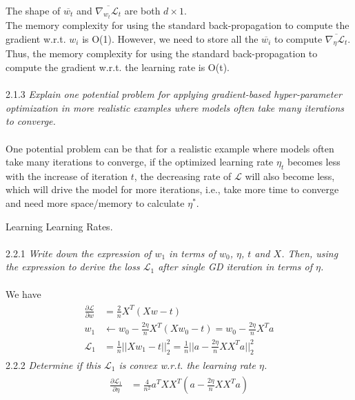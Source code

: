 \documentclass{myhw}
\begin{document}
\begin{homeworkProblem}
\begin{homeworkSection}
\begin{gather*}
\end{gather*}
The shape of $\overline{w_t}$ and $\overline{\nabla_{w_t} \mathcal{L}_t}$ are both $d \times 1$.\\
The memory complexity for using the standard back-propagation to compute the gradient w.r.t. $w_i$ is O(1). However, we need to store all the $\overline{w_i}$ to compute $\overline{\nabla_{\eta} \mathcal{L}_t}$.
Thus, the memory complexity for using the standard back-propagation to compute the gradient w.r.t. the learning rate is O(t). 
\\ \\
2.1.3 \emph{Explain one potential problem for applying gradient-based hyper-parameter optimization in more realistic examples where models often take many iterations to converge.} \\ 
\\
One potential problem can be that for a realistic example where models often take many iterations to converge, if the optimized learning rate $\eta_t$ becomes less with the increase of iteration $t$, the decreasing rate of $\mathcal{L}$ will also become less, which will drive the model for more iterations, i.e., take more time to converge and need more space/memory to calculate $\eta^*$. 
\end{homeworkSection}
\begin{homeworkSection}
Learning Learning Rates. \\ \\
2.2.1 \emph{Write down the expression of $w_1$ in terms of $w_0$, $\eta$, $t$ and $X$. Then, using the expression to derive the loss $\mathcal{L}_1$ after single GD iteration in terms of $\eta$.} \\ \\
We have
\begin{gather*}
\begin{aligned}
\frac{\partial \mathcal{L}}{\partial w} &= \frac{2}{n} X^T(X w - t) \\
w_1 &\leftarrow w_0 - \frac{2 \eta}{n} X^T (X w_0 - t) = w_0 - \frac{2 \eta}{n} X^T a \\
\mathcal{L}_1 &= \frac{1}{n} ||X w_1 - t||_2^2 = \frac{1}{n} ||a - \frac{2 \eta}{n} X X^T a||_2^2
\end{aligned}
\end{gather*}
2.2.2 \emph{Determine if this $\mathcal{L}_1$ is convex w.r.t. the learning rate $\eta$.} 
\begin{gather*}
\begin{aligned}
\frac{\partial \mathcal{L}_1}{\partial \eta} &= \frac{4}{n^2} a^T XX^T (a-\frac{2\eta}{n}XX^Ta) \\

\end{aligned}
\end{gather*}
\end{homeworkSection}
\end{homeworkProblem}
\end{document}
